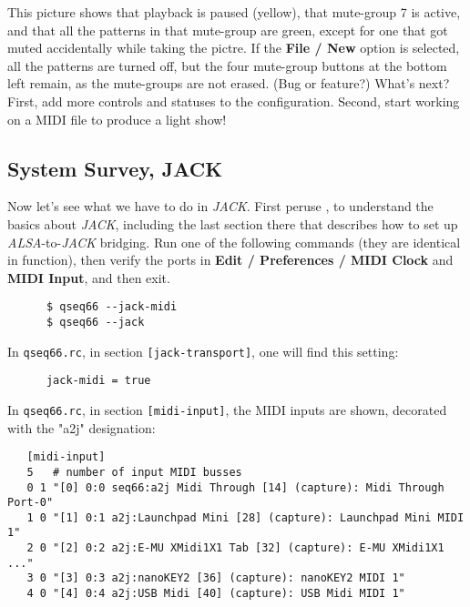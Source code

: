    This picture shows that playback is paused (yellow), that mute-group 7 is
   active, and that all the patterns in that mute-group are green, except for
   one that got muted accidentally while taking the pictre.
   If the \textbf{File / New} option is selected, all the patterns are turned
   off, but the four mute-group buttons at the bottom left remain, as the
   mute-groups are not erased.  (Bug or feature?)
   What's next?  First, add more controls and statuses to the configuration.
   Second, start working on a MIDI file to produce a light show!

\subsection{System Survey, JACK}
\label{subsec:launchpad_mini_survey_jack}

   Now let's see what we have to do in \textsl{JACK}.
   First peruse , to understand the basics about
   \textsl{JACK}, including the last section there that describes how to set up
   \textsl{ALSA}-to-\textsl{JACK} bridging.
   Run one of the following commands (they are identical in function),
   then verify the ports in
   \textbf{Edit / Preferences / MIDI Clock} and \textbf{MIDI Input}, and then
   exit.

   \begin{verbatim}
      $ qseq66 --jack-midi
      $ qseq66 --jack
   \end{verbatim}

   In \texttt{qseq66.rc}, in section \texttt{[jack-transport]},
   one will find this setting:

   \begin{verbatim}
      jack-midi = true
   \end{verbatim}

   In \texttt{qseq66.rc}, in section \texttt{[midi-input]},
   the MIDI inputs are shown, decorated with the "a2j" designation:

   \begin{verbatim}
   [midi-input]
   5   # number of input MIDI busses
   0 1 "[0] 0:0 seq66:a2j Midi Through [14] (capture): Midi Through Port-0"
   1 0 "[1] 0:1 a2j:Launchpad Mini [28] (capture): Launchpad Mini MIDI 1"
   2 0 "[2] 0:2 a2j:E-MU XMidi1X1 Tab [32] (capture): E-MU XMidi1X1 ..."
   3 0 "[3] 0:3 a2j:nanoKEY2 [36] (capture): nanoKEY2 MIDI 1"
   4 0 "[4] 0:4 a2j:USB Midi [40] (capture): USB Midi MIDI 1"
   \end{verbatim}

